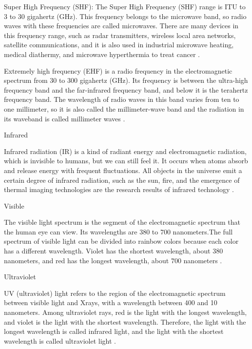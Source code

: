 \documentclass[conference]{IEEEtran}
\newcommand{\subparagraph}{}
\begin{document}
Super High Frequency (SHF): The Super High Frequency (SHF) range is ITU to 3 to 30 gigahertz (GHz). This frequency belongs to 
the microwave band, so radio waves with these frequencies are called microwaves. There are many devices in this frequency range, 
such as radar transmitters, wireless local area networks, satellite communications, and it is also used in industrial microwave 
heating, medical diathermy, and microwave hyperthermia to treat cancer \cite{Superhig8:online}.
    
Extremely high frequency (EHF) is a radio frequency in the electromagnetic spectrum from 30 to 300 gigahertz (GHz). Its frequency 
is between the ultra-high frequency band and the far-infrared frequency band, and below it is the terahertz frequency band. The 
wavelength of radio waves in this band varies from ten to one millimeter, so it is also called the millimeter-wave band and the 
radiation in its waveband is called millimeter waves \cite{Extremel31:online}.

\subparagraph{Infrared}
    
Infrared radiation (IR) is a kind of radiant energy and electromagnetic radiation, which is invisible to humans, but we can 
still feel it. It occurs when atoms absorb and release energy with frequent fluctuations. All objects in the universe emit a 
certain degree of infrared radiation, such as the sun, fire, and the emergence of thermal imaging technologies are the research 
results of infrared technology \cite{L40416:online}.

\subparagraph{Visible}
    
The visible light spectrum is the segment of the electromagnetic spectrum that the human eye can view. Its wavelengths are 
380 to 700 nanometers.The full spectrum of visible light can be divided into rainbow colors because each color has a different 
wavelength. Violet has the shortest wavelength, about 380 nanometers, and red has the longest wavelength, about 700 nanometers \cite{Vis73:online}.
 
\subparagraph{Ultraviolet}
    
UV (ultraviolet) light refers to the region of the electromagnetic spectrum between visible light and X\-rays, with a wavelength 
between 400 and 10 nanometers. Among ultraviolet rays, red is the light with the longest wavelength, and violet is the light 
with the shortest wavelength. Therefore, the light with the longest wavelength is called infrared light, and the light with the 
shortest wavelength is called ultraviolet light \cite{uvlight14:online}.
\end{document}
